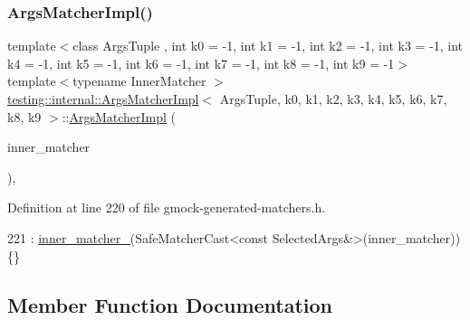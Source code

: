 \subsubsection{\texorpdfstring{Args\+Matcher\+Impl()}{ArgsMatcherImpl()}}
{\footnotesize\ttfamily template$<$class Args\+Tuple , int k0 = -\/1, int k1 = -\/1, int k2 = -\/1, int k3 = -\/1, int k4 = -\/1, int k5 = -\/1, int k6 = -\/1, int k7 = -\/1, int k8 = -\/1, int k9 = -\/1$>$ \\
template$<$typename Inner\+Matcher $>$ \\
\hyperlink{classtesting_1_1internal_1_1ArgsMatcherImpl}{testing\+::internal\+::\+Args\+Matcher\+Impl}$<$ Args\+Tuple, k0, k1, k2, k3, k4, k5, k6, k7, k8, k9 $>$\+::\hyperlink{classtesting_1_1internal_1_1ArgsMatcherImpl}{Args\+Matcher\+Impl} (\begin{DoxyParamCaption}\item[{const Inner\+Matcher \&}]{inner\+\_\+matcher }\end{DoxyParamCaption})\hspace{0.3cm}{\ttfamily [inline]}, {\ttfamily [explicit]}}



Definition at line 220 of file gmock-\/generated-\/matchers.\+h.


\begin{DoxyCode}
221       : \hyperlink{classtesting_1_1internal_1_1ArgsMatcherImpl_a719ba7e85d3381661021d699c9978ed0}{inner\_matcher\_}(SafeMatcherCast<const SelectedArgs&>(inner\_matcher)) \{\}
\end{DoxyCode}


\subsection{Member Function Documentation}
\mbox{\label{classtesting_1_1internal_1_1ArgsMatcherImpl_ac8ff5369879836567cedb5434bcca5b9}} 
